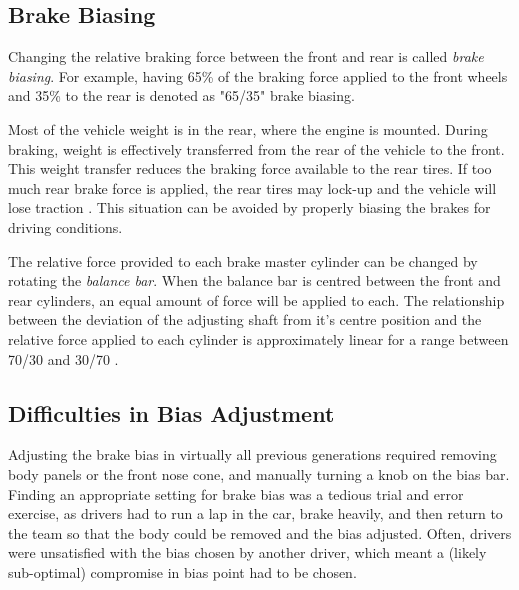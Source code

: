 \subsection{Brake Biasing}

Changing the relative braking force between the front and rear is called \emph{brake biasing}. For example, having 65\% of the braking force applied to the front wheels and 35\% to the rear is denoted as "65/35" brake biasing. 

Most of the vehicle weight is in the rear, where the engine is mounted. During braking, weight is effectively transferred from the rear of the vehicle to the front. This weight transfer reduces the braking force available to the rear tires. If too much rear brake force is applied, the rear tires may lock-up and the vehicle will lose traction \cite{FundVehicleDynamics}. This situation can be avoided by properly biasing the brakes for driving conditions.

The relative force provided to each brake master cylinder can be changed by rotating the \emph{balance bar}. When the balance bar is centred between the front and rear cylinders, an equal amount of force will be applied to each. The relationship between the deviation of the adjusting shaft from it's centre position and the relative force applied to each cylinder is approximately linear for a range between 70/30 and 30/70 \cite{TiltonBrakeBias}. 

\subsection{Difficulties in Bias Adjustment}

Adjusting the brake bias in virtually all previous generations required removing body panels or the front nose cone, and manually turning a knob on the bias bar. Finding an appropriate setting for brake bias was a tedious trial and error exercise, as drivers had to run a lap in the car, brake heavily, and then return to the team so that the body could be removed and the bias adjusted. Often, drivers were unsatisfied with the bias chosen by another driver, which meant a (likely sub-optimal) compromise in bias point had to be chosen.
